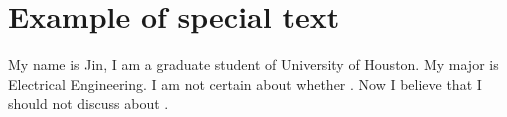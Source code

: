\documentclass[]{CKAgn}
\begin{document}
\section{Example of special text}

My name is  Jin, I am a graduate  student of University of Houston. My major is Electrical  Engineering. I am not certain about whether . Now I believe that I should not discuss about .
\end{document}
